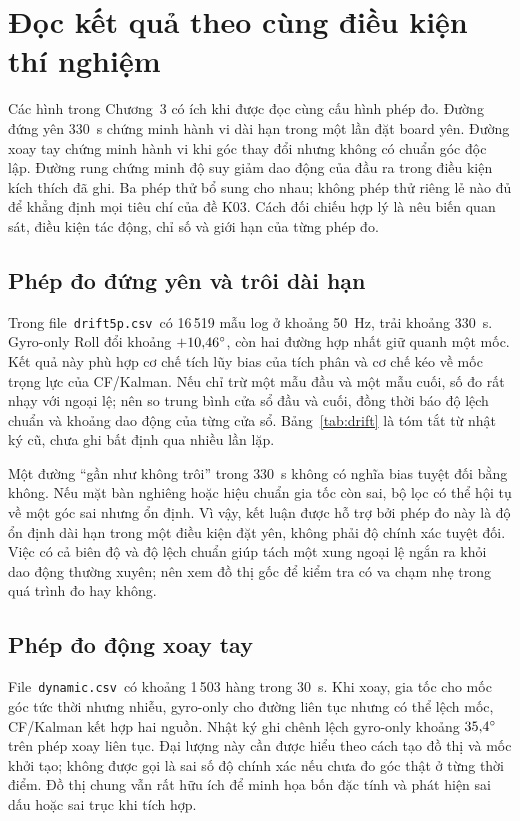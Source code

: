\section{Đọc kết quả theo cùng điều kiện thí nghiệm}
Các hình trong Chương~3 có ích khi được đọc cùng cấu hình phép đo. Đường đứng yên 330~s chứng minh hành vi dài hạn trong một lần đặt board yên. Đường xoay tay chứng minh hành vi khi góc thay đổi nhưng không có chuẩn góc độc lập. Đường rung chứng minh độ suy giảm dao động của đầu ra trong điều kiện kích thích đã ghi. Ba phép thử bổ sung cho nhau; không phép thử riêng lẻ nào đủ để khẳng định mọi tiêu chí của đề K03. Cách đối chiếu hợp lý là nêu biến quan sát, điều kiện tác động, chỉ số và giới hạn của từng phép đo.

\subsection{Phép đo đứng yên và trôi dài hạn}
Trong file \,\texttt{drift5p.csv}\, có 16\,519 mẫu log ở khoảng 50~Hz, trải khoảng 330~s. Gyro-only Roll đổi khoảng $+10{,}46^{\circ}$, còn hai đường hợp nhất giữ quanh một mốc. Kết quả này phù hợp cơ chế tích lũy bias của tích phân và cơ chế kéo về mốc trọng lực của CF/Kalman. Nếu chỉ trừ một mẫu đầu và một mẫu cuối, số đo rất nhạy với ngoại lệ; nên so trung bình cửa sổ đầu và cuối, đồng thời báo độ lệch chuẩn và khoảng dao động của từng cửa sổ. Bảng~\ref{tab:drift} là tóm tắt từ nhật ký cũ, chưa ghi bất định qua nhiều lần lặp.

Một đường ``gần như không trôi'' trong 330~s không có nghĩa bias tuyệt đối bằng không. Nếu mặt bàn nghiêng hoặc hiệu chuẩn gia tốc còn sai, bộ lọc có thể hội tụ về một góc sai nhưng ổn định. Vì vậy, kết luận được hỗ trợ bởi phép đo này là độ ổn định dài hạn trong một điều kiện đặt yên, không phải độ chính xác tuyệt đối. Việc có cả biên độ và độ lệch chuẩn giúp tách một xung ngoại lệ ngắn ra khỏi dao động thường xuyên; nên xem đồ thị gốc để kiểm tra có va chạm nhẹ trong quá trình đo hay không.

\subsection{Phép đo động xoay tay}
File \,\texttt{dynamic.csv}\, có khoảng 1\,503 hàng trong 30~s. Khi xoay, gia tốc cho mốc góc tức thời nhưng nhiễu, gyro-only cho đường liên tục nhưng có thể lệch mốc, CF/Kalman kết hợp hai nguồn. Nhật ký ghi chênh lệch gyro-only khoảng $35{,}4^{\circ}$ trên phép xoay liên tục. Đại lượng này cần được hiểu theo cách tạo đồ thị và mốc khởi tạo; không được gọi là sai số độ chính xác nếu chưa đo góc thật ở từng thời điểm. Đồ thị chung vẫn rất hữu ích để minh họa bốn đặc tính và phát hiện sai dấu hoặc sai trục khi tích hợp.

